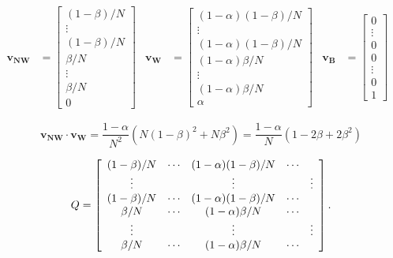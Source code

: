 \documentclass[11pt]{article}
\begin{document}
\begin{align}
\mathbf{v_{NW}}& = \left[\begin{array}{c}
(1-\beta)/N \\ \vdots \\ (1-\beta)/N \\ \beta/N \\ \vdots \\ \beta/N \\ 0
\end{array}\right] & 
\mathbf{v_W}& = \left[\begin{array}{c}
 (1-\alpha)(1-\beta)/N \\ \vdots \\ (1-\alpha)(1-\beta)/N \\ (1-\alpha)\beta/N \\ \vdots \\ (1-\alpha)\beta/N \\ \alpha
\end{array}\right] & 
\mathbf{v_B}& = \left[\begin{array}{c}
0 \\ \vdots \\ 0 \\ 0 \\ \vdots \\ 0 \\ 1
\end{array}\right] & 
\end{align}

\begin{equation}
\mathbf{v_{NW}}\cdot\mathbf{v_W} = \frac{1-\alpha}{N^2}(N(1-\beta)^2 + N\beta^2) = \frac{1-\alpha}{N}(1 - 2\beta + 2\beta^2)
\end{equation} 

\begin{equation}
Q=\left[\begin{array}{c c c c c c}
(1-\beta)/N&\cdots & (1-\alpha)(1-\beta)/N & \cdots\\
 \vdots & & \vdots & & \vdots\\
(1-\beta)/N & \cdots & (1-\alpha)(1-\beta)/N & \cdots\\
\beta/N & \cdots & (1-\alpha)\beta/N & \cdots \\
\vdots & & \vdots & & \vdots\\
\beta/N & \cdots & (1-\alpha)\beta/N & \cdots\\
\end{array}
\right].
\end{equation}
\end{document}
